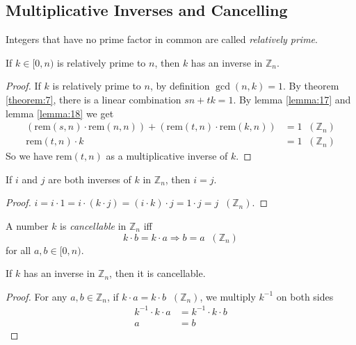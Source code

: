 \documentclass[11pt]{article}
\newcommand{\rem}{\mathrm{rem}}
\begin{document}
\subsection{Multiplicative Inverses and Cancelling}

\begin{definition}
Integers that have no prime factor in common are called \emph{relatively prime}.
\end{definition}

\begin{lemma}
If $k \in [0, n)$ is relatively prime to $n$, then $k$ has an inverse in $\mathbb{Z}_n$.
\end{lemma}

\begin{proof}
If $k$ is relatively prime to $n$, by definition $\gcd(n,k) = 1$. By theorem
\ref{theorem:7}, there is a linear combination $sn+tk=1$. By lemma \ref{lemma:17} and lemma
\ref{lemma:18} we get
\begin{align*}
  (\rem(s,n) \cdot \rem(n,n)) + (\rem(t,n) \cdot \rem(k,n)) &= 1 \;\;(\mathbb{Z}_n) \\
  \rem(t,n) \cdot k &= 1 \;\;(\mathbb{Z}_n)
\end{align*}
So we have $\rem(t,n)$ as a multiplicative inverse of $k$.
\end{proof}

\begin{lemma}
If $i$ and $j$ are both inverses of $k$ in $\mathbb{Z}_n$, then $i = j$.
\end{lemma}

\begin{proof}
$i = i \cdot 1 = i \cdot (k \cdot j) = (i \cdot k) \cdot j = 1 \cdot j = j
\;\;(\mathbb{Z}_n)$.
\end{proof}

\begin{definition}
A number $k$ is \emph{cancellable} in $\mathbb{Z}_n$ iff
\[
  k \cdot b = k \cdot a \Rightarrow b = a \;\;(\mathbb{Z}_n)
\]
for all $a, b \in [0, n)$.
\end{definition}

\begin{lemma}
If $k$ has an inverse in $\mathbb{Z}_n$, then it is cancellable.
\end{lemma}

\begin{proof}
For any $a, b \in \mathbb{Z}_n$, if $k \cdot a = k \cdot b \;\;(\mathbb{Z}_n)$, we multiply
$k^{-1}$ on both sides
\begin{align*}
k^{-1} \cdot k \cdot a &= k^{-1} \cdot k \cdot b \\
a &= b
\end{align*}
\end{proof}
\end{document}
